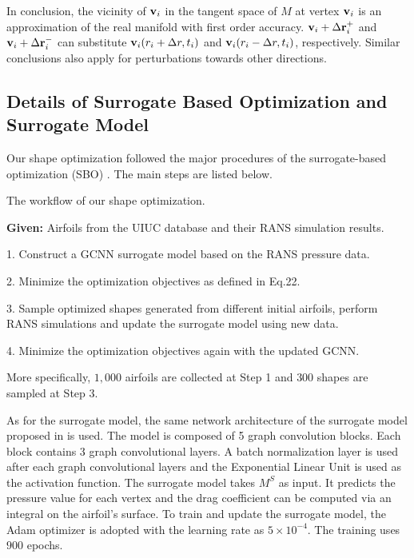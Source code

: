 In conclusion, the vicinity of $\mathbf{v}_i$ in the tangent space of $M$ at vertex $\mathbf{v}_i$ is an approximation of the real manifold with first order accuracy. $\mathbf{v}_i+\Delta \mathbf{r}_i^+$ and $\mathbf{v}_i+\Delta \mathbf{r}_i^-$ can substitute $\mathbf{v}_i(r_i+\Delta r, t_i)$ and $\mathbf{v}_i(r_i-\Delta r, t_i)$, respectively.
Similar conclusions also apply for perturbations towards other directions.

\subsection{Details of Surrogate Based Optimization and Surrogate Model}
\label{ch3:sec:appendix_surrogate}

Our shape optimization followed the major procedures of the surrogate-based optimization (SBO) \cite{aa.Queipo2005}. The main steps are listed below.

\begin{algorithm}
    \caption{The workflow of our shape optimization.}
    \label{ch3:alg:RL-SBO}

    \textbf{Given:} Airfoils from the UIUC database and their RANS simulation results.

    1. Construct a GCNN surrogate model based on the RANS pressure data.

    2. Minimize the optimization objectives as defined in Eq.22.

    3. Sample optimized shapes generated from different initial airfoils, perform RANS simulations and update the surrogate model using new data.

    4. Minimize the optimization objectives again with the updated GCNN.
\end{algorithm}

More specifically, $1,000$ airfoils are collected at Step 1 and $300$ shapes are sampled at Step 3.

As for the surrogate model, the same network architecture of the surrogate model proposed in \cite{aa.Baque2018} is used.
The model is composed of 5 graph convolution blocks.
Each block contains 3 graph convolutional layers.
A batch normalization layer is used after each graph convolutional layers and the Exponential Linear Unit is used as the activation function.
The surrogate model takes $M^S$ as input.
It predicts the pressure value for each vertex and the drag coefficient can be computed via an integral on the airfoil's surface.
To train and update the surrogate model, the Adam optimizer is adopted with the learning rate as $5\times10^{-4}$. The training uses $900$ epochs.